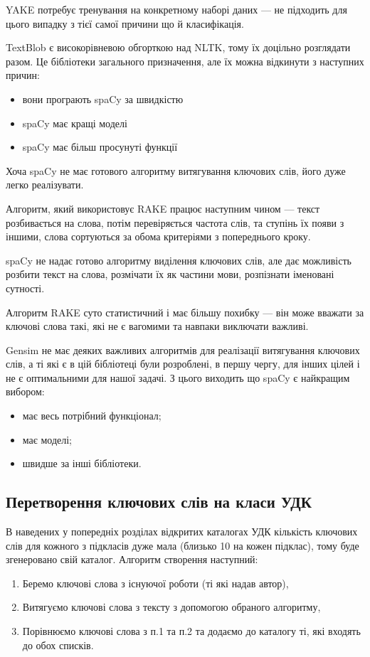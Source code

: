 \documentclass[14pt]{extarticle}
\begin{document}
  YAKE потребує тренування на конкретному наборі даних ---
  не підходить для цього випадку з тієї самої причини що й класифікація.

  TextBlob є високорівневою обгорткою над NLTK,
  тому їх доцільно розглядати разом.
  Це бібліотеки загального призначення,
  але їх можна відкинути з наступних причин:
  \begin{itemize}[labelindent=\dimexpr{}\relax, leftmargin=*]
    \item вони програють spaCy за швидкістю
    \item spaCy має кращі моделі
    \item spaCy має більш просунуті функції
  \end{itemize}

  Хоча spaCy не має готового алгоритму витягування ключових слів,
  його дуже легко реалізувати.

  Алгоритм, який використовує RAKE працює наступним чином ---
  текст розбивається на слова, потім перевіряється частота слів,
  та ступінь їх появи з іншими,
  слова сортуються за обома критеріями з попереднього кроку.

  spaCy не надає готово алгоритму виділення ключових слів,
  але дає можливість розбити текст на слова, розмічати їх як частини мови,
  розпізнати іменовані сутності.

  Алгоритм RAKE суто статистичний і має більшу похибку ---
  він може вважати за ключові слова такі,
  які не є вагомими та навпаки виключати важливі.

  Gensim не має деяких важливих алгоритмів
  для реалізації витягування ключових слів,
  а ті які є в цій бібліотеці були розроблені, в першу чергу,
  для інших цілей і не є оптимальними для нашої задачі.
  З цього виходить що spaCy є найкращим вибором:
  \begin{itemize}[labelindent=\dimexpr{}\relax, leftmargin=*]
    \item має весь потрібний функціонал;
    \item має моделі;
    \item швидше за інші бібліотеки.
  \end{itemize}

  \subsection{Перетворення ключових слів на класи УДК}
  В наведених у попередніх розділах відкритих каталогах УДК
  кількість ключових слів для кожного з підкласів дуже мала
  (близько 10 на кожен підклас), тому буде згенеровано свій каталог.
  Алгоритм створення наступний:
  \begin{enumerate}[labelindent=\dimexpr\parindent*2\relax, leftmargin=*]
    \item Беремо ключові слова з існуючої роботи (ті які надав автор),
    \item Витягуємо ключові слова з тексту з допомогою обраного алгоритму,
    \item Порівнюємо ключові слова з п.1 та п.2 та додаємо до каталогу ті,
    які входять до обох списків.
  \end{enumerate}
\end{document}
